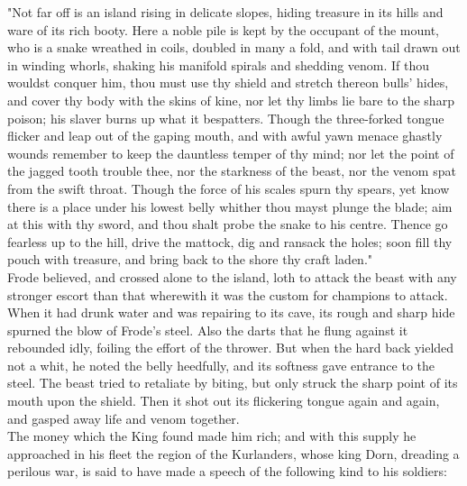 \documentclass[10pt,a4paper]{report}
\begin{document}
"Not far off is an island rising in delicate slopes, hiding treasure in its hills and ware of its rich booty. Here a noble pile is kept by the occupant of the mount, who is a snake wreathed in coils, doubled in many a fold, and with tail drawn out in winding whorls, shaking his manifold spirals and shedding venom. If thou wouldst conquer him, thou must use thy shield and stretch thereon bulls' hides, and cover thy body with the skins of kine, nor let thy limbs lie bare to the sharp poison; his slaver burns up what it bespatters. Though the three-forked tongue flicker and leap out of the gaping mouth, and with awful yawn menace ghastly wounds remember to keep the dauntless temper of thy mind; nor let the point of the jagged tooth trouble thee, nor the starkness of the beast, nor the venom spat from the swift throat. Though the force of his scales spurn thy spears, yet know there is a place under his lowest belly whither thou mayst plunge the blade; aim at this with thy sword, and thou shalt probe the snake to his centre. Thence go fearless up to the hill, drive the mattock, dig and ransack the holes; soon fill thy pouch with treasure, and bring back to the shore thy craft laden."\\

Frode believed, and crossed alone to the island, loth to attack the beast with any stronger escort than that wherewith it was the custom for champions to attack. When it had drunk water and was repairing to its cave, its rough and sharp hide spurned the blow of Frode's steel. Also the darts that he flung against it rebounded idly, foiling the effort of the thrower. But when the hard back yielded not a whit, he noted the belly heedfully, and its softness gave entrance to the steel. The beast tried to retaliate by biting, but only struck the sharp point of its mouth upon the shield. Then it shot out its flickering tongue again and again, and gasped away life and venom together.\\

The money which the King found made him rich; and with this supply he approached in his fleet the region of the Kurlanders, whose king Dorn, dreading a perilous war, is said to have made a speech of the following kind to his soldiers:\\
\end{document}
